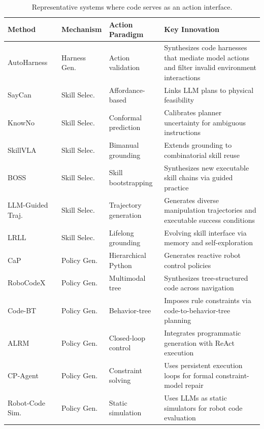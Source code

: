 \begin{table}[t]
\centering
\caption{Representative systems where code serves as an action interface.}
\renewcommand{\arraystretch}{1.15}
\setlength{\tabcolsep}{4pt}
\footnotesize
\begin{tabularx}{\textwidth}{p{2.7cm}p{1.7cm}p{3.0cm}X}
\toprule
\textbf{Method} & \textbf{Mechanism} & \textbf{Action Paradigm} & \textbf{Key Innovation} \\
\midrule
AutoHarness~\cite{lou2026autoharnessimprovingllmagents} & Harness Gen. & Action validation & Synthesizes code harnesses that mediate model actions and filter invalid environment interactions \\
SayCan~\cite{ahn2022can} & Skill Selec. & Affordance-based & Links LLM plans to physical feasibility \\
KnowNo~\cite{ren2023robots} & Skill Selec. & Conformal prediction & Calibrates planner uncertainty for ambiguous instructions \\
SkillVLA~\cite{zhai2026skillvla} & Skill Selec. & Bimanual grounding & Extends grounding to combinatorial skill reuse \\
BOSS~\cite{zhang2023bootstrap} & Skill Selec. & Skill bootstrapping & Synthesizes new executable skill chains via guided practice \\
LLM-Guided Traj.~\cite{ha2023scaling} & Skill Selec. & Trajectory generation & Generates diverse manipulation trajectories and executable success conditions \\
LRLL~\cite{tziafas2024lifelong} & Skill Selec. & Lifelong grounding & Evolving skill interface via memory and self-exploration \\
CaP~\cite{liang2023code} & Policy Gen. & Hierarchical Python & Generates reactive robot control policies \\
RoboCodeX~\cite{mu2024robocodex} & Policy Gen. & Multimodal tree & Synthesizes tree-structured code across navigation \\
Code-BT~\cite{zhang2025codebt} & Policy Gen. & Behavior-tree & Imposes rule constraints via code-to-behavior-tree planning \\
ALRM~\cite{santos2026alrm} & Policy Gen. & Closed-loop control & Integrates programmatic generation with ReAct execution \\
CP-Agent~\cite{szeider2025cp} & Policy Gen. & Constraint solving & Uses persistent execution loops for formal constraint-model repair \\
Robot-Code Sim.~\cite{wang2025llm} & Policy Gen. & Static simulation & Uses LLMs as static simulators for robot code evaluation \\

\end{tabularx}
\end{table}
